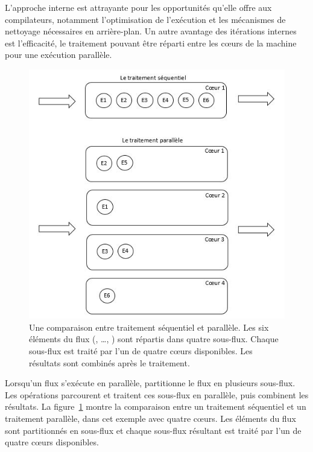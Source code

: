 L'approche interne est attrayante pour les opportunit\'es qu'elle offre aux compilateurs, notamment l'optimisation de l'exécution et les m\'ecanismes de nettoyage n\'ecessaires en arri\`ere-plan. Un autre avantage des it\'erations internes est l'efficacit\'e, le traitement pouvant \^etre r\'eparti entre les cœurs de la machine pour une ex\'ecution parall\`ele.


\begin{figure}
\centering
     \includegraphics[width=1.0\textwidth]{Figures/ComparisonSequentialVsParallel.jpg}
      \caption[Une comparaison entre traitement s\'equentiel et parall\`ele.]{Une comparaison entre traitement s\'equentiel et parall\`ele. Les six \'el\'ements du flux (, \ldots,  ) sont r\'epartis dans quatre sous-flux. Chaque sous-flux est trait\'e par l'un de quatre cœurs disponibles. Les r\'esultats sont combin\'es apr\`es le traitement.}
       \label{ComparisonSequentialVsParallel.fig}
\end{figure}


Lorsqu'un flux s'ex\'ecute en parall\`ele,  partitionne le flux en plusieurs sous-flux. Les op\'erations parcourent et traitent ces sous-flux en parall\`ele, puis combinent les r\'esultats. La figure~\ref{ComparisonSequentialVsParallel.fig} montre la comparaison entre  un traitement s\'equentiel et un traitement parall\`ele, dans cet exemple avec quatre c\oe{}urs. Les \'el\'ements du flux sont partitionn\'es en sous-flux et chaque sous-flux r\'esultant est trait\'e par l'un de quatre cœurs disponibles.  



